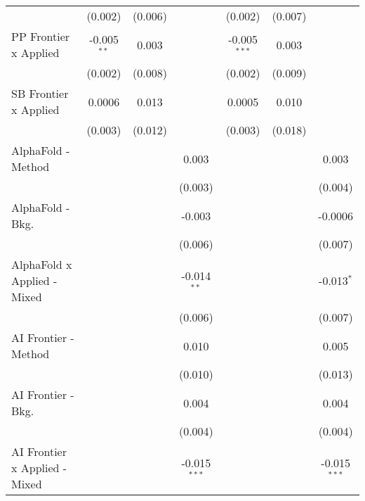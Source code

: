 \begin{tabular}{lcccccc}
                                  & (0.002)       & (0.006)        &                & (0.002)        & (0.007)        &   \\   
   PP Frontier x Applied          & -0.005$^{**}$ & 0.003          &                & -0.005$^{***}$ & 0.003          &   \\   
                                  & (0.002)       & (0.008)        &                & (0.002)        & (0.009)        &   \\   
   SB Frontier x Applied          & 0.0006        & 0.013          &                & 0.0005         & 0.010          &   \\   
                                  & (0.003)       & (0.012)        &                & (0.003)        & (0.018)        &   \\   
   AlphaFold - Method             &               &                & 0.003          &                &                & 0.003\\   
                                  &               &                & (0.003)        &                &                & (0.004)\\   
   AlphaFold - Bkg.               &               &                & -0.003         &                &                & -0.0006\\   
                                  &               &                & (0.006)        &                &                & (0.007)\\   
   AlphaFold x Applied - Mixed    &               &                & -0.014$^{**}$  &                &                & -0.013$^{*}$\\   
                                  &               &                & (0.006)        &                &                & (0.007)\\   
   AI Frontier - Method           &               &                & 0.010          &                &                & 0.005\\   
                                  &               &                & (0.010)        &                &                & (0.013)\\   
   AI Frontier - Bkg.             &               &                & 0.004          &                &                & 0.004\\   
                                  &               &                & (0.004)        &                &                & (0.004)\\   
   AI Frontier x Applied - Mixed  &               &                & -0.015$^{***}$ &                &                & -0.015$^{***}$\\   

\end{tabular}
